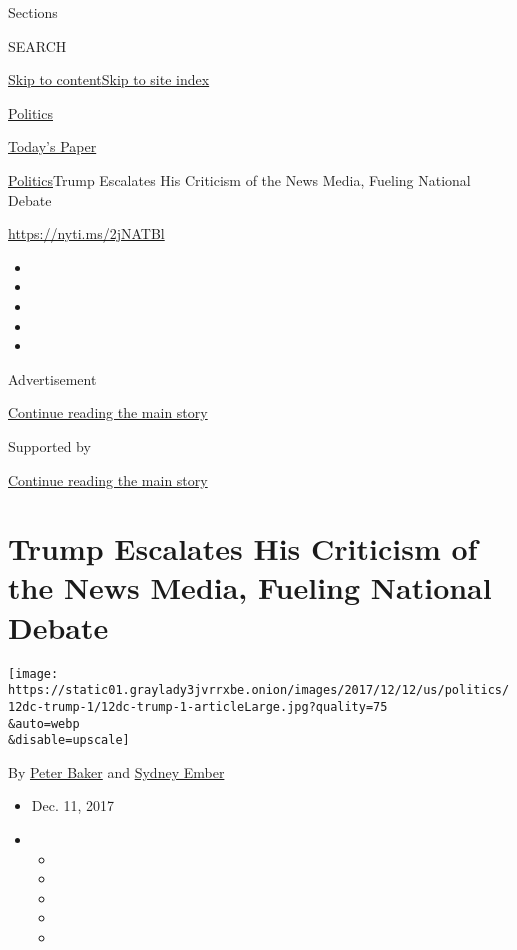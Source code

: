 Sections

SEARCH

\protect\hyperlink{site-content}{Skip to
content}\protect\hyperlink{site-index}{Skip to site index}

\href{https://www.nytimes3xbfgragh.onion/section/politics}{Politics}

\href{https://myaccount.nytimes3xbfgragh.onion/auth/login?response_type=cookie\&client_id=vi}{}

\href{https://www.nytimes3xbfgragh.onion/section/todayspaper}{Today's
Paper}

\href{/section/politics}{Politics}\textbar{}Trump Escalates His
Criticism of the News Media, Fueling National Debate

\url{https://nyti.ms/2jNATBl}

\begin{itemize}
\item
\item
\item
\item
\item
\end{itemize}

Advertisement

\protect\hyperlink{after-top}{Continue reading the main story}

Supported by

\protect\hyperlink{after-sponsor}{Continue reading the main story}

\hypertarget{trump-escalates-his-criticism-of-the-news-media-fueling-national-debate}{%
\section{Trump Escalates His Criticism of the News Media, Fueling
National
Debate}\label{trump-escalates-his-criticism-of-the-news-media-fueling-national-debate}}

\texttt{[image: https://static01.graylady3jvrrxbe.onion/images/2017/12/12/us/politics/12dc-trump-1/12dc-trump-1-articleLarge.jpg?quality=75\\\&auto=webp\\\&disable=upscale]}

By \href{http://www.nytimes3xbfgragh.onion/by/peter-baker}{Peter Baker}
and \href{http://www.nytimes3xbfgragh.onion/by/sydney-ember}{Sydney
Ember}

\begin{itemize}
\item
  Dec. 11, 2017
\item
  \begin{itemize}
  \item
  \item
  \item
  \item
  \item
  \end{itemize}
\end{itemize}

